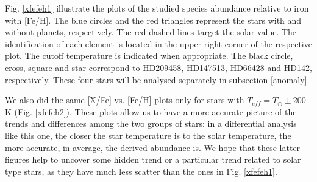 \documentclass[dvips,12pt,a4paper]{report}
\begin{document}
{{Fig. \ref{xfefeh1} illustrate the plots of the studied species abundance relative to iron with [Fe/H]. The blue circles and the red triangles represent the stars with and without planets, respectively. The red dashed lines target the solar value. The identification of each element is located in the upper right corner of the respective plot. The cutoff temperature is indicated when appropriate. The black circle, cross, square and star correspond to HD209458, HD147513, HD66428 and HD142, respectively. These four stars will be analysed separately in subsection \ref{anomaly}.

We also did the same [X/Fe] vs. [Fe/H] plots only for stars with $T_{eff}=T_\odot\pm$200 K (Fig. \ref{xfefeh2}). These plots allow us to have a more accurate picture of the trends and differences among the two groups of stars: in a differential analysis like this one, the closer the star temperature is to the solar temperature, the more accurate, in average, the derived abundance is. We hope that these latter figures help to uncover some hidden trend or a particular trend related to solar type stars, as they have much less scatter than the ones in Fig. \ref{xfefeh1}.

}}
\end{document}

